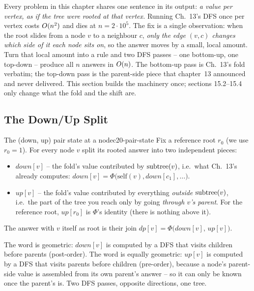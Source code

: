\begin{topicintro}
Every problem in this chapter shares one sentence in its output: \emph{a value
per vertex, as if the tree were rooted at that vertex.} Running Ch.~13's DFS
once per vertex costs $O(n^2)$ and dies at $n=2\cdot10^{5}$. The fix is a
single observation: when the root slides from a node $v$ to a neighbour $c$,
\emph{only the edge $(v,c)$ changes which side of it each node sits on}, so the
answer moves by a small, local amount. Turn that local amount into a rule and
two DFS passes -- one bottom-up, one top-down -- produce all $n$ answers in
$O(n)$. The bottom-up pass is Ch.~13's fold verbatim; the top-down pass is
the parent-side piece that chapter~13 announced and never delivered. This
section builds the machinery once; sections 15.2--15.4 only change what the
fold and the shift are.
\end{topicintro}

\subsection{The Down/Up Split}

\begin{definition}{The (down, up) pair state at a node}{c20-pair-state}
Fix a reference root $r_0$ (we use $r_0=1$). For every node $v$ split its
rooted answer into two independent pieces:
\begin{itemize}[nosep,leftmargin=1.4em]
  \item $\mathit{down}[v]$ -- the fold's value contributed by
        $\operatorname{subtree}(v)$, i.e.\ what Ch.~13's 
        already computes: $\mathit{down}[v] = \Phi\bigl(\text{self}(v),
        \mathit{down}[c_1], \dots\bigr)$.
  \item $\mathit{up}[v]$ -- the fold's value contributed by everything
        \emph{outside} $\operatorname{subtree}(v)$, i.e.\ the part of the tree you reach
        only by going \emph{through $v$'s parent}. For the reference root,
        $\mathit{up}[r_0]$ is $\Phi$'s identity (there is nothing above it).
\end{itemize}
The answer with $v$ itself as root is their join
$\mathit{dp}[v] = \Phi\bigl(\mathit{down}[v],\, \mathit{up}[v]\bigr)$.
\end{definition}

The word  is geometric: $\mathit{down}[v]$ is computed by a DFS that
visits children before parents (post-order). The word  is equally
geometric: $\mathit{up}[v]$ is computed by a DFS that visits parents before
children (pre-order), because a node's parent-side value is assembled from its
own parent's answer -- so it can only be known once the parent's is. Two DFS
passes, opposite directions, one tree.

